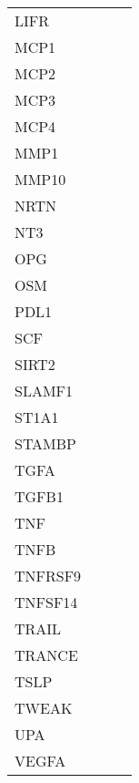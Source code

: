 \begin{table}[!htbp]
{\begin{tabular}{ lp{10cm} p{10cm} l }
        \multicolumn{1}{l|}{ LIFR } &    &    &           \\ 
        \multicolumn{1}{l|}{ MCP1 } &    &    &           \\ 
        \multicolumn{1}{l|}{ MCP2 } &    &    &           \\ 
        \multicolumn{1}{l|}{ MCP3 } &    &    &           \\ 
        \multicolumn{1}{l|}{ MCP4 } &    &    &           \\ 
        \multicolumn{1}{l|}{ MMP1 } &    &    &           \\ 
        \multicolumn{1}{l|}{ MMP10 } &    &    &           \\ 
        \multicolumn{1}{l|}{ NRTN } &    &    &           \\ 
        \multicolumn{1}{l|}{ NT3 } &    &    &           \\ 
        \multicolumn{1}{l|}{ OPG } &    &    &           \\ 
        \multicolumn{1}{l|}{ OSM } &    &    &           \\ 
        \multicolumn{1}{l|}{ PDL1 } &    &    &           \\ 
        \multicolumn{1}{l|}{ SCF } &    &    &           \\ 
        \multicolumn{1}{l|}{ SIRT2 } &    &    &           \\ 
        \multicolumn{1}{l|}{ SLAMF1 } &    &    &           \\ 
        \multicolumn{1}{l|}{ ST1A1 } &    &    &           \\ 
        \multicolumn{1}{l|}{ STAMBP } &    &    &           \\ 
        \multicolumn{1}{l|}{ TGFA } &    &    &           \\ 
        \multicolumn{1}{l|}{ TGFB1 } &    &    &           \\ 
        \multicolumn{1}{l|}{ TNF } &    &    &           \\ 
        \multicolumn{1}{l|}{ TNFB } &    &    &           \\ 
        \multicolumn{1}{l|}{ TNFRSF9 } &    &    &           \\ 
        \multicolumn{1}{l|}{ TNFSF14 } &    &    &           \\ 
        \multicolumn{1}{l|}{ TRAIL } &    &    &           \\ 
        \multicolumn{1}{l|}{ TRANCE } &    &    &           \\ 
        \multicolumn{1}{l|}{ TSLP } &    &    &           \\ 
        \multicolumn{1}{l|}{ TWEAK } &    &    &           \\ 
        \multicolumn{1}{l|}{ UPA } &    &    &           \\ 
        \multicolumn{1}{l|}{ VEGFA } &    &    &           \\ 


\end{tabular}}
\end{table}
